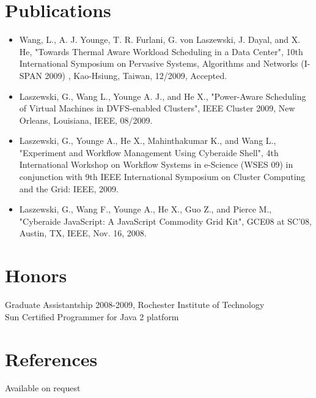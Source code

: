 \documentclass[margin]{res}
\begin{document}
\begin{resume}
\section{Publications}

\begin{itemize}
\item Wang, L., A. J. Younge, T. R. Furlani, G. von Laszewski, J. Dayal, and X. He, "Towards Thermal Aware Workload Scheduling in a Data Center", 10th International Symposium on Pervasive Systems, Algorithms and Networks (I-SPAN 2009) , Kao-Hsiung, Taiwan, 12/2009, Accepted.
\item Laszewski, G., Wang L., Younge A. J., and He X.,  "Power-Aware Scheduling of Virtual Machines in DVFS-enabled Clusters",  IEEE Cluster 2009, New Orleans, Louisiana, IEEE, 08/2009.
\item Laszewski, G., Younge A., He X., Mahinthakumar K., and Wang L.,  "Experiment and Workflow Management Using Cyberaide Shell",  4th International Workshop on Workflow Systems in e-Science (WSES 09) in conjunction with 9th IEEE International Symposium on Cluster Computing and the Grid: IEEE, 2009.
\item Laszewski, G., Wang F., Younge A., He X., Guo Z., and Pierce M.,  "Cyberaide JavaScript: A JavaScript Commodity Grid Kit",  GCE08 at SC'08, Austin, TX, IEEE, Nov. 16, 2008.
\end{itemize}

\section{Honors}
Graduate Assistantship 2008-2009, Rochester Institute of Technology\\
Sun Certified Programmer for Java 2 platform

\section{References}
Available on request
\end{resume} 
\end{document}
